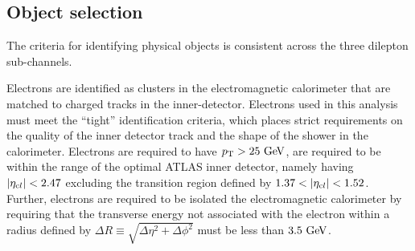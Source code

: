 


\subsection{Object selection}
\label{s:object}

The criteria for identifying physical objects is consistent across the three dilepton sub-channels.

Electrons are identified as clusters in the electromagnetic calorimeter
that are matched to charged tracks in the inner-detector.
Electrons used in this analysis must meet the ``tight'' identification criteria,
which places strict requirements on the quality of the inner detector track and the
shape of the shower in the calorimeter.
Electrons are required to have $\pt>25\GeV$, are required to be within the range of the
optimal ATLAS inner detector, namely having $|\eta_{\text cl}|<2.47$ excluding the
transition region defined by $1.37<|\eta_{\text cl}|<1.52$.
Further, electrons are required to be isolated the electromagnetic calorimeter
by requiring that the transverse energy not associated with the electron within 
a radius defined by $\Delta R\equiv\sqrt{\Delta\eta^2 + \Delta\phi^2}$ must be less than $3.5\GeV$.



